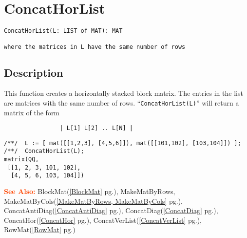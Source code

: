 \documentclass[a4paper]{mybook}
\newenvironment{command}{}{} %
\newcommand\SeeAlso{\par\textcolor{OrangeRed}{\textbf{\large See Also: }}}
\begin{document}
\section{ConcatHorList}
\label{ConcatHorList}
\begin{command} %


\begin{Verbatim}[label=syntax, rulecolor=\color{MidnightBlue},
frame=single]
ConcatHorList(L: LIST of MAT): MAT

where the matrices in L have the same number of rows
\end{Verbatim}


\subsection*{Description}

This function creates a horizontally stacked block matrix.  The
entries in the list are matrices with the same number of rows.
``\verb&ConcatHorList(L)&'' will return a matrix of the form
\begin{verbatim}
                | L[1] L[2] .. L[N] |
\end{verbatim}
\begin{Verbatim}[label=example, rulecolor=\color{PineGreen}, frame=single]
/**/  L := [ mat([[1,2,3], [4,5,6]]), mat([[101,102], [103,104]]) ];
/**/  ConcatHorList(L);
matrix(QQ,
 [[1, 2, 3, 101, 102],
  [4, 5, 6, 103, 104]])
\end{Verbatim}


\SeeAlso %
  BlockMat(\ref{BlockMat} pg.\pageref{BlockMat}), 
    MakeMatByRows, MakeMatByCols(\ref{MakeMatByRows, MakeMatByCols} pg.\pageref{MakeMatByRows, MakeMatByCols}), 
    ConcatAntiDiag(\ref{ConcatAntiDiag} pg.\pageref{ConcatAntiDiag}), 
    ConcatDiag(\ref{ConcatDiag} pg.\pageref{ConcatDiag}), 
    ConcatHor(\ref{ConcatHor} pg.\pageref{ConcatHor}), 
    ConcatVerList(\ref{ConcatVerList} pg.\pageref{ConcatVerList}), 
    RowMat(\ref{RowMat} pg.\pageref{RowMat})
\end{command} %
\end{document}
